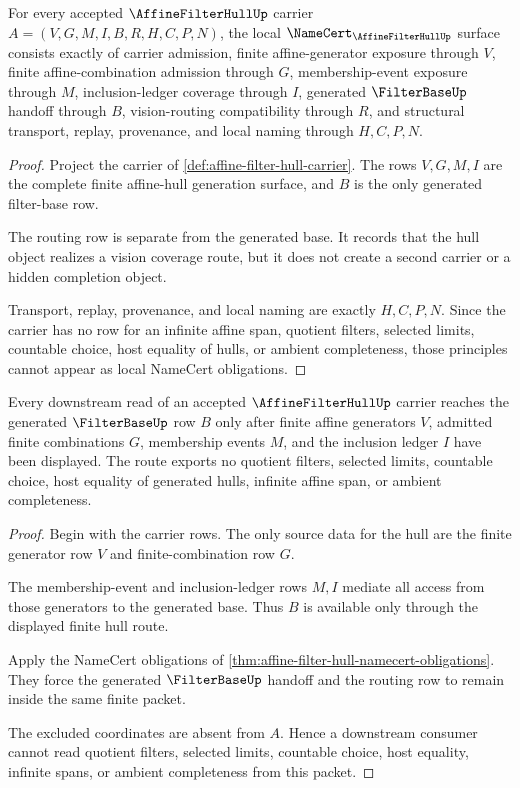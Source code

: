 \begin{theorem}
\label{thm:affine-filter-hull-namecert-obligations}
For every accepted $\AffineFilterHullUp$ carrier $A=(V,G,M,I,B,R,H,C,P,N)$, the local $\NameCert_{\AffineFilterHullUp}$ surface consists exactly of carrier admission, finite affine-generator exposure through $V$, finite affine-combination admission through $G$, membership-event exposure through $M$, inclusion-ledger coverage through $I$, generated $\FilterBaseUp$ handoff through $B$, vision-routing compatibility through $R$, and structural transport, replay, provenance, and local naming through $H,C,P,N$.
\end{theorem}
\begin{proof}
Project the carrier of \autoref{def:affine-filter-hull-carrier}. The rows $V,G,M,I$ are the complete finite affine-hull generation surface, and $B$ is the only generated filter-base row.

The routing row is separate from the generated base. It records that the hull object realizes a vision coverage route, but it does not create a second carrier or a hidden completion object.

Transport, replay, provenance, and local naming are exactly $H,C,P,N$. Since the carrier has no row for an infinite affine span, quotient filters, selected limits, countable choice, host equality of hulls, or ambient completeness, those principles cannot appear as local NameCert obligations.
\end{proof}

\begin{theorem}
\label{thm:affine-filter-hull-generated-base-route}
Every downstream read of an accepted $\AffineFilterHullUp$ carrier reaches the generated $\FilterBaseUp$ row $B$ only after finite affine generators $V$, admitted finite combinations $G$, membership events $M$, and the inclusion ledger $I$ have been displayed. The route exports no quotient filters, selected limits, countable choice, host equality of generated hulls, infinite affine span, or ambient completeness.
\end{theorem}
\begin{proof}
Begin with the carrier rows. The only source data for the hull are the finite generator row $V$ and finite-combination row $G$.

The membership-event and inclusion-ledger rows $M,I$ mediate all access from those generators to the generated base. Thus $B$ is available only through the displayed finite hull route.

Apply the NameCert obligations of \autoref{thm:affine-filter-hull-namecert-obligations}. They force the generated $\FilterBaseUp$ handoff and the routing row to remain inside the same finite packet.

The excluded coordinates are absent from $A$. Hence a downstream consumer cannot read quotient filters, selected limits, countable choice, host equality, infinite spans, or ambient completeness from this packet.
\end{proof}

